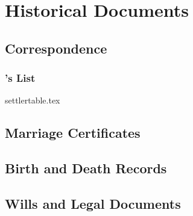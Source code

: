 \chapter{Historical Documents}

\section{Correspondence}

\subsection[Biggar's Settler List]{\biggarASurname{}'s \settler{} List}
{settlertable.tex}

\section{Marriage Certificates}

\section{Birth and Death Records}

\section{Wills and Legal Documents}